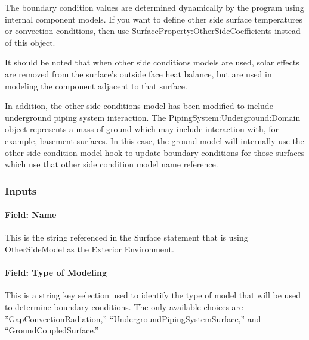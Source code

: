 The boundary condition values are determined dynamically by the program using internal component models. If you want to define other side surface temperatures or convection conditions, then use SurfaceProperty:OtherSideCoefficients instead of this object.

It should be noted that when other side conditions models are used, solar effects are removed from the surface's outside face heat balance, but are used in modeling the component adjacent to that surface.

In addition, the other side conditions model has been modified to include underground piping system interaction. The PipingSystem:Underground:Domain object represents a mass of ground which may include interaction with, for example, basement surfaces. In this case, the ground model will internally use the other side condition model hook to update boundary conditions for those surfaces which use that other side condition model name reference.

\subsubsection{Inputs}\label{inputs-5}

\paragraph{Field: Name}\label{field-name-4}

This is the string referenced in the Surface statement that is using OtherSideModel as the Exterior Environment.

\paragraph{Field: Type of Modeling}\label{field-type-of-modeling}

This is a string key selection used to identify the type of model that will be used to determine boundary conditions. The only available choices are ''GapConvectionRadiation,'' ``UndergroundPipingSystemSurface,'' and ``GroundCoupledSurface.''


